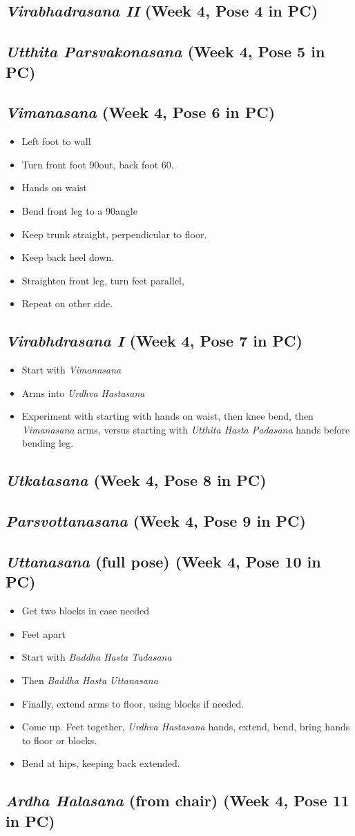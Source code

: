 \documentclass{book}
\newcommand{\apose}[1]{\emph{#1}}
\newcommand{\ardhal}{\apose{Ardha Halasana}}
\newcommand{\badhasttad}{\apose{Baddha Hasta Tadasana}}
\newcommand{\badhastutt}{\apose{Baddha Hasta Uttanasana}}
\newcommand{\parsvo}{\apose{Parsvottanasana}}
\newcommand{\urdhast}{\apose{Urdhva Hastasana}}
\newcommand{\utka}{\apose{Utkatasana}}
\newcommand{\utt}{\apose{Uttanasana}}
\newcommand{\utthastpad}{\apose{Utthita Hasta Padasana}}
\newcommand{\uttparsva}{\apose{Utthita Parsvakonasana}}
\newcommand{\vim}{\apose{Vimanasana}}
\newcommand{\virai}{\apose{Virabhdrasana I}}
\newcommand{\viraii}{\apose{Virabhadrasana II}}
\newcommand{\PC}[2]{{\normalfont \hfill(Week #1, Pose #2 in PC)}}
\newcommand{\newpose}[1]{{{#1}}}
\newcounter{pose}
\newcommand{\pose}{\subsection}
\begin{document}
\pose{ \viraii{} \PC{4}{4}}

\pose{ \uttparsva{} \PC{4}{5}}

\pose{ \newpose{\vim{}} \PC{4}{6}}

  \begin{itemize}
  \item Left foot to wall
  \item Turn front foot 90\textdegree out, back foot 60\textdegree.
  \item Hands on waist
  \item Bend front leg to a 90\textdegree angle
  \item Keep trunk straight, perpendicular to floor.
  \item Keep back heel down.
  \item Straighten front leg, turn feet parallel, 
  \item Repeat on other side.
  \end{itemize}

\pose{ \newpose{\virai{}} \PC{4}{7}}

  \begin{itemize}
  \item Start with \vim{}
  \item Arms into \urdhast{}
  \item Experiment with starting with hands on waist, then knee bend,
    then \vim{} arms, versus starting with \utthastpad{} hands before
    bending leg.
  \end{itemize}

\pose{ \utka{}  \PC{4}{8}}

\pose{ \parsvo{} \PC{4}{9}}

\pose{ \newpose{\utt} (full pose) \PC{4}{10}}

  \begin{itemize}
  \item Get two blocks in case needed
  \item Feet apart
  \item Start with \badhasttad{}
  \item Then \badhastutt{}
  \item Finally, extend arms to floor, using blocks if needed. 
  \item Come up. Feet together, \urdhast{} hands, extend, bend, bring
    hands to floor or blocks.
  \item Bend at hips, keeping back extended. 
  \end{itemize}

\pose{ \ardhal{} (from chair) \PC{4}{11}}
\end{document}
